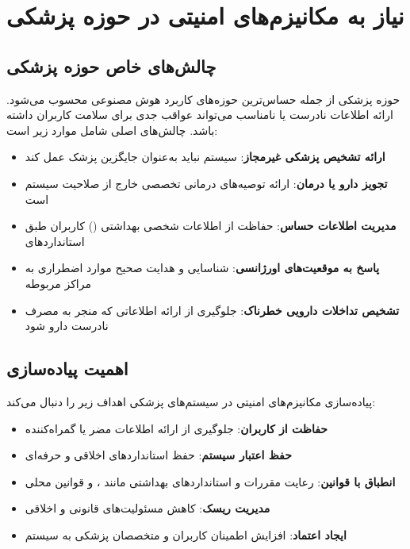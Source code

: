 \documentclass[11pt, a4paper, oneside]{book}
\begin{document}
	\section{نیاز به مکانیزم‌های امنیتی در حوزه پزشکی}

	\subsection{چالش‌های خاص حوزه پزشکی}

	حوزه پزشکی از جمله حساس‌ترین حوزه‌های کاربرد هوش مصنوعی محسوب می‌شود. ارائه اطلاعات نادرست یا نامناسب می‌تواند عواقب جدی برای سلامت کاربران داشته باشد. چالش‌های اصلی شامل موارد زیر است:

	\begin{itemize}
		\item \textbf{ارائه تشخیص پزشکی غیرمجاز}: سیستم نباید به‌عنوان جایگزین پزشک عمل کند
		\item \textbf{تجویز دارو یا درمان}: ارائه توصیه‌های درمانی تخصصی خارج از صلاحیت سیستم است
		\item \textbf{مدیریت اطلاعات حساس}: حفاظت از اطلاعات شخصی بهداشتی () کاربران طبق استانداردهای 
		\item \textbf{پاسخ به موقعیت‌های اورژانسی}: شناسایی و هدایت صحیح موارد اضطراری به مراکز مربوطه
		\item \textbf{تشخیص تداخلات دارویی خطرناک}: جلوگیری از ارائه اطلاعاتی که منجر به مصرف نادرست دارو شود
	\end{itemize}

	\subsection{اهمیت پیاده‌سازی }

	پیاده‌سازی مکانیزم‌های امنیتی در سیستم‌های پزشکی اهداف زیر را دنبال می‌کند:

	\begin{itemize}
		\item \textbf{حفاظت از کاربران}: جلوگیری از ارائه اطلاعات مضر یا گمراه‌کننده
		\item \textbf{حفظ اعتبار سیستم}: حفظ استانداردهای اخلاقی و حرفه‌ای
		\item \textbf{انطباق با قوانین}: رعایت مقررات و استانداردهای بهداشتی مانند ،  و قوانین محلی
		\item \textbf{مدیریت ریسک}: کاهش مسئولیت‌های قانونی و اخلاقی
		\item \textbf{ایجاد اعتماد}: افزایش اطمینان کاربران و متخصصان پزشکی به سیستم
	\end{itemize}
\end{document}
